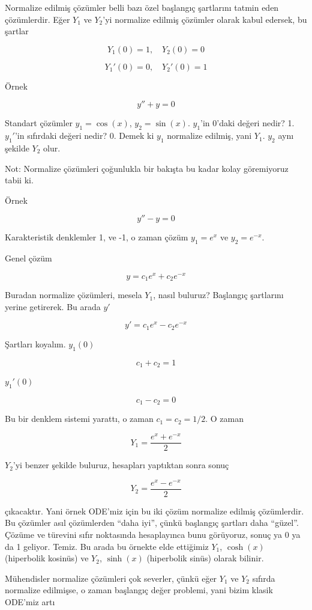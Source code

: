 \documentclass[12pt,fleqn]{article}\usepackage{../../common}
\begin{document}
Normalize edilmiş çözümler belli bazı özel başlangıç şartlarını tatmin eden
çözümlerdir. Eğer $Y_1$ ve $Y_2$'yi normalize edilmiş çözümler olarak kabul
edersek, bu şartlar

$$ Y_1(0) = 1, \quad  Y_2(0) = 0  $$

$$ Y_1'(0) = 0, \quad  Y_2'(0) = 1 $$

Örnek 

$$ y'' + y = 0 $$

Standart çözümler $y_1 = \cos(x)$, $y_2 = \sin(x)$. $y_1$'in 0'daki değeri
nedir? 1. $y_1'$'in sıfırdaki değeri nedir? 0. Demek ki $y_1$ normalize
edilmiş, yani $Y_1$. $y_2$ aynı şekilde $Y_2$ olur. 

Not: Normalize çözümleri çoğunlukla bir bakışta bu kadar kolay göremiyoruz
tabii ki. 

Örnek 

$$ y'' - y = 0 $$

Karakteristik denklemler 1, ve -1, o zaman çözüm $y_1 = e^x$ ve $y_2 =
e^{-x}$. 

Genel çözüm 

$$ y = c_1 e^x + c_2 e^{-x} $$

Buradan normalize çözümleri, mesela $Y_1$, nasıl buluruz? Başlangıç
şartlarını yerine getirerek. Bu arada $y'$

$$ y' = c_1 e^x - c_2 e^{-x} $$

Şartları koyalım. $y_1(0)$

$$ c_1 + c_2 = 1 $$

$y_1'(0)$

$$ c_1 - c_2 = 0 $$

Bu bir denklem sistemi yarattı, o zaman $c_1 = c_2 = 1/2$. O zaman 

$$ Y_1 = \frac{e^x + e^{-x}}{2} $$

$Y_2$'yi benzer şekilde buluruz, hesapları yaptıktan sonra sonuç

$$ Y_2 = \frac{e^x - e^{-x}}{2} $$

çıkacaktır. Yani örnek ODE'miz için bu iki çözüm normalize edilmiş
çözümlerdir. Bu çözümler asıl çözümlerden ``daha iyi'', çünkü başlangıç
şartları daha ``güzel''. Çözüme ve türevini sıfır noktasında hesaplayınca
bunu görüyoruz, sonuç ya 0 ya da 1 geliyor. Temiz. Bu arada bu örnekte elde
ettiğimiz $Y_1$, $\cosh(x)$ (hiperbolik kosinüs) ve $Y_2$, $\sinh(x)$
(hiperbolik sinüs) olarak bilinir. 

Mühendisler normalize çözümleri çok severler, çünkü eğer $Y_1$ ve $Y_2$
sıfırda normalize edilmişse, o zaman başlangıç değer problemi, yani bizim
klasik ODE'miz artı
\end{document}
